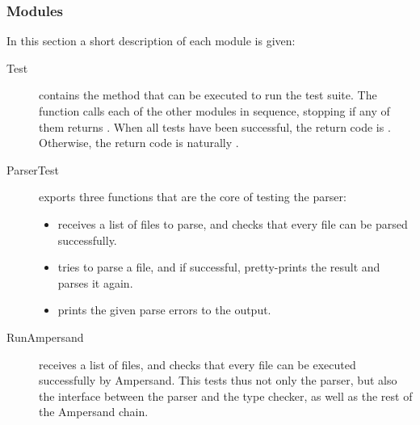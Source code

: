   \subsubsection{Modules}
  \label{tests:test-modules}
  In this section a short description of each module is given:%
  \begin{description}
    \item[Test] contains the  method that can be executed to run the test suite.
      The  function calls each of the other modules in sequence, stopping if any of them returns .
      When all tests have been successful, the return code is .
      Otherwise, the return code is naturally .
	  
    \item[ParserTest] exports three functions that are the core of testing the parser:
      \begin{itemize}
        \item {} receives a list of files to parse, and checks that every file can be parsed successfully.
        \item {} tries to parse a file, and if successful, pretty-prints the result and parses it again.
        \item {} prints the given parse errors to the output.
      \end{itemize}
    
    \item[RunAmpersand] receives a list of files, and checks that every file can be executed successfully by Ampersand.
      This tests thus not only the parser, but also the interface between the parser and the type checker, as well as the rest of the Ampersand chain.
  \end{description}
	  
